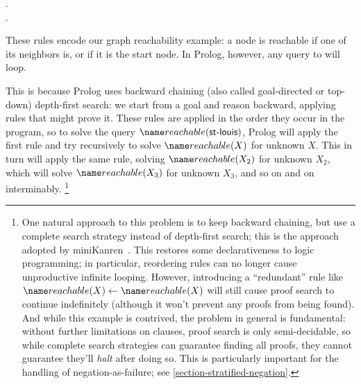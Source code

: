 \label{datalog-reachable}
\begin{datalog}
   \gets {} \conj {}.\\
  .
\end{datalog}


\noindent
These rules encode our graph reachability example: a node is reachable if one of its neighbors is, or if it is the start node.
%
%
In Prolog, however, any query to  will loop.

This is because Prolog uses backward chaining (also called goal-directed or
top-down) depth-first search: we start from a goal and reason backward, applying
rules that might prove it.
%
These rules are applied in the order they occur in the program, so to solve the
query $\atom{reachable}{\datum{st-louis}}$, Prolog will apply the
first rule and try recursively to solve $\atom{reachable}{X}$ for
unknown $X$.
%
This in turn will apply the same rule, solving $\atom{reachable}{X_2}$ for unknown $X_2$, which will solve $\atom{reachable}{X_3}$
for unknown $X_3$, and so on and on interminably.%
%
\footnote{One natural approach to this problem is to keep backward chaining, but
  use a complete search strategy instead of depth-first search; this is the
  approach adopted by miniKanren~\citep{kanren}. This restores some
  declarativeness to logic programming; in particular, reordering rules can no
  longer cause unproductive infinite looping. However, introducing a
  ``redundant'' rule like $\atom{reachable}{X} \gets \atom{reachable}{X}$ will
  still cause proof search to continue indefinitely (although it won't prevent
  any proofs from being found). And while this example is contrived, the problem
  in general is fundamental: without further limitations on clauses, proof
  search is only semi-decidable, so while complete search strategies can
  guarantee finding all proofs, they cannot guarantee they'll \emph{halt} after
  doing so. This is particularly important for the handling of
  negation-as-failure; see \cref{section-stratified-negation}.}

